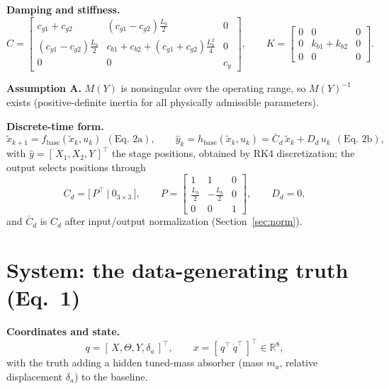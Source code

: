 \documentclass[11pt]{article}
\newcommand{\R}{\mathbb{R}}
\newcommand{\xb}{\tilde{x}}
\newcommand{\yh}{\hat{y}}
\newcommand{\Cbar}{\bar{C}_d}
\newcommand{\fb}{f_{\mathrm{base}}}
\newcommand{\hb}{h_{\mathrm{base}}}
\begin{document}
\medskip\noindent\textbf{Damping and stiffness.}
\begin{equation}
  C =
  \begin{bmatrix}
    c_{g1}{+}c_{g2}             & (c_{g1}{-}c_{g2})\tfrac{L_b}{2}                    & 0 \\[2mm]
    (c_{g1}{-}c_{g2})\tfrac{L_b}{2} & c_{b1}{+}c_{b2}{+}(c_{g1}{+}c_{g2})\tfrac{L_b^2}{4} & 0 \\[2mm]
    0                          & 0                                                  & c_y
  \end{bmatrix},
  \qquad
  K =
  \begin{bmatrix}
    0 & 0            & 0 \\[2mm]
    0 & k_{b1}{+}k_{b2} & 0 \\[2mm]
    0 & 0            & 0
  \end{bmatrix}.
  \label{eq:baseline-CK}
\end{equation}

\medskip\noindent\textbf{Assumption A.}\quad
$M(Y)$ is nonsingular over the operating range, so $M(Y)^{-1}$ exists (positive-definite
inertia for all physically admissible parameters).

\medskip\noindent\textbf{Discrete-time form.}
\begin{equation}
  \xb_{k+1} = \fb(\xb_k, u_k)\ \ (\text{Eq.\ 2a}) , \qquad
  \yh_k = \hb(\xb_k, u_k) = \Cbar\,\xb_k + D_d\,u_k\ \ (\text{Eq.\ 2b}) ,
  \label{eq:baseline-io}
\end{equation}
with $\yh = [\,X_1,X_2,Y\,]^\top$ the stage positions, obtained by RK4 discretization; the
output selects positions through
\begin{equation}
  C_d = \big[\, P^\top \ \big|\ 0_{3\times3} \,\big] , \qquad
  P =
  \begin{bmatrix}
    1 & 1 & 0 \\
    \tfrac{L_b}{2} & -\tfrac{L_b}{2} & 0 \\
    0 & 0 & 1
  \end{bmatrix} , \qquad
  D_d = 0 ,
  \label{eq:baseline-out}
\end{equation}
and $\Cbar$ is $C_d$ after input/output normalization (Section~\ref{sec:norm}).

\section{System: the data-generating truth \quad (Eq.~1)}

\noindent\textbf{Coordinates and state.}
\begin{equation}
  q = [\,X,\Theta,Y,\delta_a\,]^\top , \qquad
  x = [\,q^\top\ \dot q^\top\,]^\top \in \R^8 ,
  \label{eq:sys-state}
\end{equation}
with the truth adding a hidden tuned-mass absorber (mass $m_a$, relative displacement
$\delta_a$) to the baseline.
\end{document}
